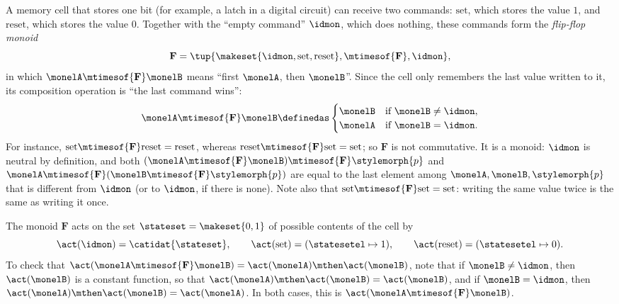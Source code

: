 \begin{example}
    \label{exa:flip-flop-action}
    A memory cell that stores one bit (for example, a latch in a digital circuit) can receive two commands: $\text{set}$, which stores the value $1$, and $\text{reset}$, which stores the value $0$.
    Together with the ``empty command'' $\idmon$, which does nothing, these commands form the \emph{flip-flop monoid}
    \begin{equation}
        \mathbf{F} = \tup{\makeset{\idmon, \text{set}, \text{reset}}, \mtimesof{\mathbf{F}}, \idmon},
    \end{equation}
    in which $\monelA \mtimesof{\mathbf{F}} \monelB$ means ``first $\monelA$, then $\monelB$''.
    Since the cell only remembers the last value written to it, its composition operation is ``the last command wins'':
    \begin{equation}
        \monelA \mtimesof{\mathbf{F}} \monelB \definedas
        \begin{cases}
            \monelB & \text{if } \monelB \neq \idmon, \\
            \monelA & \text{if } \monelB = \idmon.
        \end{cases}
    \end{equation}
    For instance, $\text{set} \mtimesof{\mathbf{F}} \text{reset} = \text{reset}$, whereas $\text{reset} \mtimesof{\mathbf{F}} \text{set} = \text{set}$; so $\mathbf{F}$ is not commutative.
    It is a monoid: $\idmon$ is neutral by definition, and both $(\monelA \mtimesof{\mathbf{F}} \monelB) \mtimesof{\mathbf{F}} \stylemorph{p}$ and $\monelA \mtimesof{\mathbf{F}} (\monelB \mtimesof{\mathbf{F}} \stylemorph{p})$ are equal to the last element among $\monelA, \monelB, \stylemorph{p}$ that is different from $\idmon$ (or to $\idmon$, if there is none).
    Note also that $\text{set} \mtimesof{\mathbf{F}} \text{set} = \text{set}$: writing the same value twice is the same as writing it once.

    The monoid $\mathbf{F}$ acts on the set $\stateset = \makeset{0, 1}$ of possible contents of the cell by
    \begin{equation}
        \act(\idmon) = \catidat{\stateset}, \qquad
        \act(\text{set}) = (\statesetel \mapsto 1), \qquad
        \act(\text{reset}) = (\statesetel \mapsto 0).
    \end{equation}
    To check that $\act(\monelA \mtimesof{\mathbf{F}} \monelB) = \act(\monelA) \mthen \act(\monelB)$, note that if $\monelB \neq \idmon$, then $\act(\monelB)$ is a constant function, so that $\act(\monelA) \mthen \act(\monelB) = \act(\monelB)$, and if $\monelB = \idmon$, then $\act(\monelA) \mthen \act(\monelB) = \act(\monelA)$.
    In both cases, this is $\act(\monelA \mtimesof{\mathbf{F}} \monelB)$.


\end{example}
